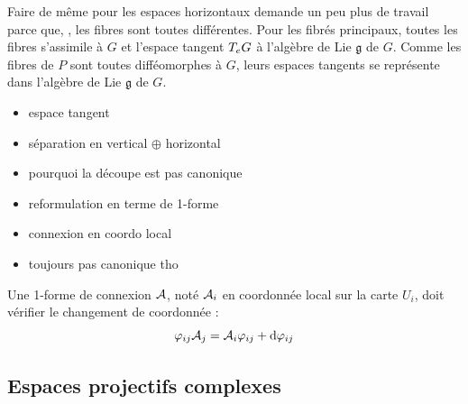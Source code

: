 Faire de même pour les espaces horizontaux demande un peu plus de travail parce que, \apriori, les fibres sont toutes différentes. Pour les fibrés principaux, toutes les fibres s'assimile à $G$ et l'espace tangent $\tg[e]{G}$ à l'algèbre de Lie $\mathfrak{g}$ de $G$.
Comme les fibres de $P$ sont toutes difféomorphes à $G$, leurs espaces tangents se représente dans l'algèbre de Lie $\mathfrak{g}$ de $G$.

\begin{itemize}
	\item espace tangent 
	
	\item séparation en vertical $\oplus$ horizontal
	
	\item pourquoi la découpe est pas canonique
	
	\item reformulation en terme de 1-forme
	
	\item connexion en coordo local
	
	\item toujours pas canonique tho
	
	
\end{itemize}
\begin{proposition}
	Une 1-forme de connexion $\conn $, noté $\conn_i$ en coordonnée local sur la carte $U_i$, doit vérifier le changement de coordonnée :
	\[\varphi_{ij}\conn_j = \conn_i \varphi_{ij} + \d \varphi_{ij}\]
\end{proposition}




\subsection{Espaces projectifs complexes}

